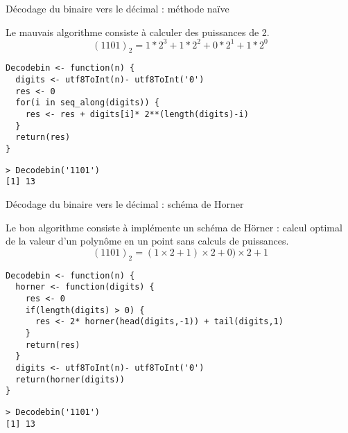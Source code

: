 \documentclass[10pt]{beamer}
\begin{document}
\begin{frame}[fragile]{Décodage du binaire vers le décimal : méthode naïve}

  Le \alert{mauvais algorithme} consiste à calculer des puissances de 2.
  $$(1101)_2 = 1*2^3 + 1*2^2 + 0*2^1 + 1*2^0$$
  \begin{lstlisting}[style=editor]
Decodebin <- function(n) {
  digits <- utf8ToInt(n)- utf8ToInt('0')
  res <- 0
  for(i in seq_along(digits)) {
    res <- res + digits[i]* 2**(length(digits)-i)
  }
  return(res)
}
\end{lstlisting}

\begin{lstlisting}
> Decodebin('1101')
[1] 13
\end{lstlisting}
\end{frame}

\begin{frame}[fragile]{Décodage du binaire vers le décimal : schéma de Horner}

  Le \alert{bon algorithme} consiste à implémente un schéma de Hörner : calcul optimal de
  la valeur d’un polynôme en un point sans calculs de puissances.
  $$(1101)_2 = (1 \times 2 + 1) \times 2 + 0) \times 2 + 1$$
  \begin{lstlisting}[style=editor]
Decodebin <- function(n) {
  horner <- function(digits) {
    res <- 0
    if(length(digits) > 0) {
      res <- 2* horner(head(digits,-1)) + tail(digits,1)
    }
    return(res)
  }
  digits <- utf8ToInt(n)- utf8ToInt('0')
  return(horner(digits))
}
\end{lstlisting}

\begin{lstlisting}
> Decodebin('1101')
[1] 13
\end{lstlisting}
\end{frame}
\end{document}
